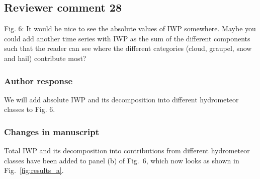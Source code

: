 \subsection*{Reviewer comment 28}
Fig.  6:  It would be nice to see the absolute values of IWP somewhere.  Maybe you could add another time series with IWP as the sum of the different components such that the reader can see where the different categories (cloud, graupel, snow and hail) contribute most?

\subsubsection*{Author response}

We will add absolute IWP and its decomposition into different hydrometeor
classes to Fig. 6.

\subsubsection*{Changes in manuscript}

Total IWP and its decomposition into contributions from different hydrometeor
classes have been added to panel (b) of Fig.~6, which now looks as shown in
Fig.~\ref{fig:results_a}.

